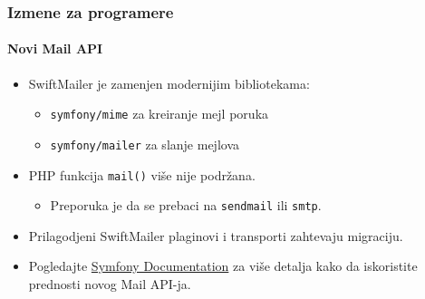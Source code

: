 
\begin{frame}[fragile]
	\frametitle{Izmene za programere}
	\framesubtitle{Novi Mail API}

	\begin{itemize}
		\item SwiftMailer je zamenjen modernijim bibliotekama:

			\begin{itemize}
				\item \texttt{symfony/mime} za kreiranje mejl poruka
				\item \texttt{symfony/mailer} za slanje mejlova
			\end{itemize}

		\item PHP funkcija \texttt{mail()} više nije podržana.

			\begin{itemize}\smaller
				\item[\ding{228}] Preporuka je da se prebaci na \texttt{sendmail} ili \texttt{smtp}.
			\end{itemize}\normalsize

		\item Prilagodjeni SwiftMailer plaginovi i transporti zahtevaju migraciju.

		\item Pogledajte \href{https://symfony.com/doc/current/mailer.html}{Symfony Documentation}
			za više detalja kako da iskoristite prednosti novog Mail API-ja.
	\end{itemize}

\end{frame}


